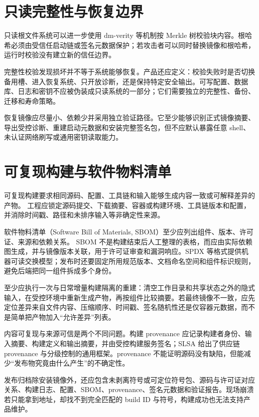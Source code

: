 \section{只读完整性与恢复边界}

只读根文件系统可以进一步使用 dm-verity 等机制按 Merkle 树校验块内容\cite{linux-dm-verity}。根哈希必须由受信任启动链或签名元数据保护；若攻击者可以同时替换镜像和根哈希，运行时校验没有建立新的信任边界。

完整性校验发现损坏并不等于系统能够恢复。产品还应定义：校验失败时是否切换备用槽、进入恢复系统、只开放诊断，还是保持特定安全输出。可写配置、数据库、日志和密钥不应被伪装成只读系统的一部分；它们需要独立的完整性、备份、迁移和寿命策略。

恢复镜像应尽量小、依赖少并采用独立验证路径。它至少能够识别正式镜像摘要、导出受控诊断、重建启动元数据和安装完整签名包，但不应默认暴露任意 shell、未认证网络刷写或通用密钥读取能力。

\section{可复现构建与软件物料清单}

可复现构建要求相同源码、配置、工具链和输入能够生成内容一致或可解释差异的产物\cite{reproducible-builds}。
工程应锁定源码提交、下载摘要、容器或构建环境、工具链版本和配置，并消除时间戳、路径和未排序输入等非确定性来源。

软件物料清单（Software Bill of Materials, SBOM）至少应列出组件、版本、许可证、来源和依赖关系。
SBOM 不是构建结束后人工整理的表格，而应由实际依赖图生成，并与镜像版本关联，用于许可证审查和漏洞响应。SPDX 等格式提供机器可读交换模型\cite{spdx-spec}；发布时还要固定所用规范版本、文档命名空间和组件标识规则，避免后端把同一组件拆成多个身份。

至少应执行一次与日常增量构建隔离的重建：清空工作目录和共享状态之外的隐式输入，在受控环境中重新生成产物，再按组件比较摘要。若最终镜像不一致，应先定位差异来自文件内容、压缩顺序、时间戳、签名随机性还是仅容器元数据，而不是简单把产物加入“允许差异”列表。

内容可复现与来源可信是两个不同问题。构建 provenance 应记录构建者身份、输入摘要、构建定义和输出摘要，并由受控构建服务签名；SLSA 给出了供应链 provenance 与分级控制的通用框架\cite{slsa-spec}。provenance 不能证明源码没有缺陷，但能减少“发布物究竟由什么产生”的不确定性。

发布归档除安装镜像外，还应包含未剥离符号或可定位符号包、源码与许可证对应关系、构建日志、配置、SBOM、provenance、签名元数据和验证报告。现场崩溃若只能拿到地址，却找不到完全匹配的 build ID 与符号，构建成功也无法支持产品维护。

